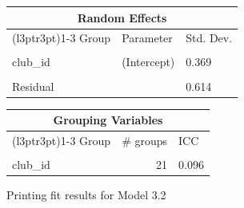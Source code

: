\documentclass[
  12pt]{article}
\begin{document}
\begin{table}[!h]
\begin{tabular}{lll}
\toprule
\multicolumn{3}{c}{Random Effects} \\
\cmidrule(l{3pt}r{3pt}){1-3}
Group & Parameter & Std. Dev.\\
\midrule
\cellcolor{gray!10}{player\_id} & \cellcolor{gray!10}{(Intercept)} & \cellcolor{gray!10}{0.946}\\
club\_id & (Intercept) & 0.369\\
\cellcolor{gray!10}{club\_id} & \cellcolor{gray!10}{season\_year\_c} & \cellcolor{gray!10}{0.033}\\
Residual &  & 0.614\\
\bottomrule
\end{tabular}
\end{table} \begin{table}[!h]
\centering
\begin{tabular}{lrl}
\toprule
\multicolumn{3}{c}{Grouping Variables} \\
\cmidrule(l{3pt}r{3pt}){1-3}
Group & \# groups & ICC\\
\midrule
\cellcolor{gray!10}{player\_id} & \cellcolor{gray!10}{2159} & \cellcolor{gray!10}{0.636}\\
club\_id & 21 & 0.096\\
\bottomrule
\end{tabular}
\end{table}

\clearpage

\newpage

Printing fit results for Model 3.2
\end{document}
